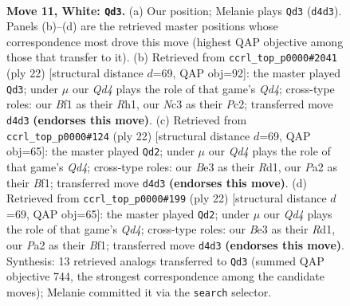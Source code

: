 \documentclass[11pt]{article}
\begin{document}
\clearpage

\begin{figure}[p]\centering
\begin{subfigure}{0.46\textwidth}\centering
\resizebox{\linewidth}{!}{%
\newchessgame
\chessboard[
  setfen={r1q1k2r/ppp1bppp/2bp1n2/8/3QP1P1/2N1BP2/PPP4P/2KR1B1R w kq - 3 11},
  showmover=false,
  pgfstyle=straightmove, color=movearrow, markmove={d4-d3}
]}
\caption{}
\end{subfigure}\hfill
\begin{subfigure}{0.46\textwidth}\centering
\resizebox{\linewidth}{!}{%
\newchessgame
\chessboard[
  setfen={r3k2r/pp2ppbp/2qp1np1/8/3QP3/2N1BP2/PPP3PP/2KR3R w kq - 2 12},
  showmover=false,
  pgfstyle=straightmove, color=movearrow, markmove={d4-d3}
]}
\caption{}
\end{subfigure}
\\[4pt]
\begin{subfigure}{0.46\textwidth}\centering
\resizebox{\linewidth}{!}{%
\newchessgame
\chessboard[
  setfen={r3k2r/1pqbbppp/p2ppn2/6B1/3QP3/2N2P2/PPP3PP/1K1R1B1R w kq - 1 12},
  showmover=false,
  pgfstyle=straightmove, color=movearrow, markmove={d4-d2}
]}
\caption{}
\end{subfigure}\hfill
\begin{subfigure}{0.46\textwidth}\centering
\resizebox{\linewidth}{!}{%
\newchessgame
\chessboard[
  setfen={r3k2r/1pqbbppp/p2ppn2/6B1/3QP3/2N2P2/PPP3PP/1K1R1B1R w kq - 1 12},
  showmover=false,
  pgfstyle=straightmove, color=movearrow, markmove={d4-d2}
]}
\caption{}
\end{subfigure}
\caption{\textbf{Move 11, White: \texttt{Qd3}.} (a) Our position; Melanie plays \texttt{Qd3} (\texttt{d4d3}). Panels (b)--(d) are the retrieved master positions whose correspondence most drove this move (highest QAP objective among those that transfer to it). (b) Retrieved from \texttt{ccrl\_top\_p0000\#2041} (ply 22) [structural distance $d$=69, QAP obj=92]: the master played \texttt{Qd3}; under $\mu$ our \emph{Qd4} plays the role of that game's \emph{Qd4}; cross-type roles: our \emph{B}f1 as their \emph{R}h1, our \emph{N}c3 as their \emph{P}c2; transferred move \texttt{d4d3} \textbf{(endorses this move)}. (c) Retrieved from \texttt{ccrl\_top\_p0000\#124} (ply 22) [structural distance $d$=69, QAP obj=65]: the master played \texttt{Qd2}; under $\mu$ our \emph{Qd4} plays the role of that game's \emph{Qd4}; cross-type roles: our \emph{B}e3 as their \emph{R}d1, our \emph{P}a2 as their \emph{B}f1; transferred move \texttt{d4d3} \textbf{(endorses this move)}. (d) Retrieved from \texttt{ccrl\_top\_p0000\#199} (ply 22) [structural distance $d$=69, QAP obj=65]: the master played \texttt{Qd2}; under $\mu$ our \emph{Qd4} plays the role of that game's \emph{Qd4}; cross-type roles: our \emph{B}e3 as their \emph{R}d1, our \emph{P}a2 as their \emph{B}f1; transferred move \texttt{d4d3} \textbf{(endorses this move)}. Synthesis: 13 retrieved analogs transferred to \texttt{Qd3} (summed QAP objective 744, the strongest correspondence among the candidate moves); Melanie committed it via the \texttt{search} selector.}
\label{fig:thought-m20}
\end{figure}
\end{document}
